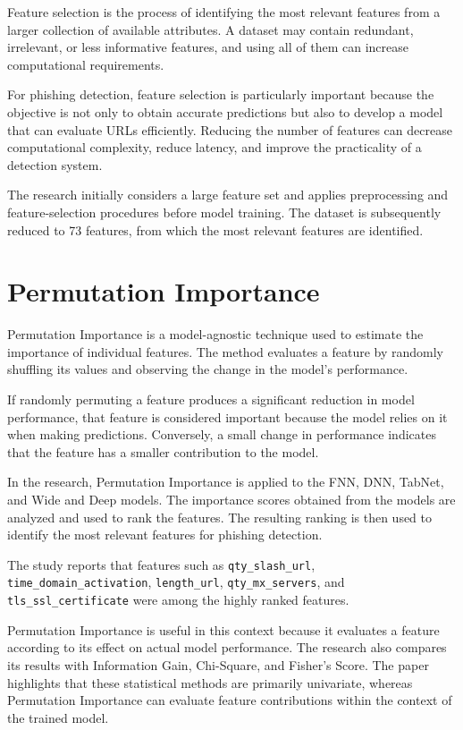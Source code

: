 \documentclass[12pt,a4paper]{report}
\begin{document}
Feature selection is the process of identifying the most relevant
features from a larger collection of available attributes. A
dataset may contain redundant, irrelevant, or less informative
features, and using all of them can increase computational
requirements.

For phishing detection, feature selection is particularly important
because the objective is not only to obtain accurate predictions but
also to develop a model that can evaluate URLs efficiently.
Reducing the number of features can decrease computational
complexity, reduce latency, and improve the practicality of a
detection system.

The research initially considers a large feature set and applies
preprocessing and feature-selection procedures before model
training. The dataset is subsequently reduced to 73 features, from
which the most relevant features are identified.

\section{Permutation Importance}

Permutation Importance is a model-agnostic technique used to
estimate the importance of individual features. The method evaluates
a feature by randomly shuffling its values and observing the change
in the model's performance.

If randomly permuting a feature produces a significant reduction in
model performance, that feature is considered important because the
model relies on it when making predictions. Conversely, a small
change in performance indicates that the feature has a smaller
contribution to the model.

In the research, Permutation Importance is applied to the FNN, DNN,
TabNet, and Wide and Deep models. The importance scores obtained
from the models are analyzed and used to rank the features. The
resulting ranking is then used to identify the most relevant
features for phishing detection.

The study reports that features such as
\texttt{qty\_slash\_url}, \texttt{time\_domain\_activation},
\texttt{length\_url}, \texttt{qty\_mx\_servers}, and
\texttt{tls\_ssl\_certificate} were among the highly ranked
features.

Permutation Importance is useful in this context because it
evaluates a feature according to its effect on actual model
performance. The research also compares its results with
Information Gain, Chi-Square, and Fisher's Score. The paper
highlights that these statistical methods are primarily univariate,
whereas Permutation Importance can evaluate feature contributions
within the context of the trained model.
\end{document}
